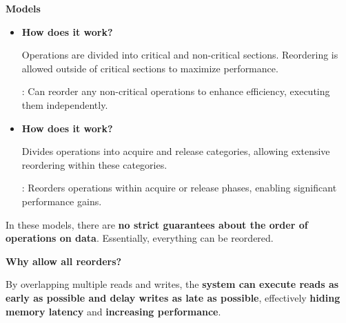 \highspace
\begin{flushleft}
    \textcolor{Green3}{ \textbf{Models}}
\end{flushleft}
\begin{itemize}
    \item {}
    \begin{flushleft}
        \textcolor{Green3}{ \textbf{How does it work?}}
    \end{flushleft}
    Operations are divided into critical and non-critical sections. Reordering is allowed outside of critical sections to maximize performance.

    : Can reorder any non-critical operations to enhance efficiency, executing them independently.


    \item {}
    \begin{flushleft}
        \textcolor{Green3}{ \textbf{How does it work?}}
    \end{flushleft}
    Divides operations into acquire and release categories, allowing extensive reordering within these categories.

    : Reorders operations within acquire or release phases, enabling significant performance gains.
\end{itemize}
In these models, there are \textbf{no strict guarantees about the order of operations on data}. Essentially, everything can be reordered.

\begin{flushleft}
    \textcolor{Green3}{ \textbf{Why allow all reorders?}}
\end{flushleft}
By overlapping multiple reads and writes, the \textbf{system can execute reads as early as possible and delay writes as late as possible}, effectively \textbf{hiding memory latency} and \textbf{increasing performance}.
